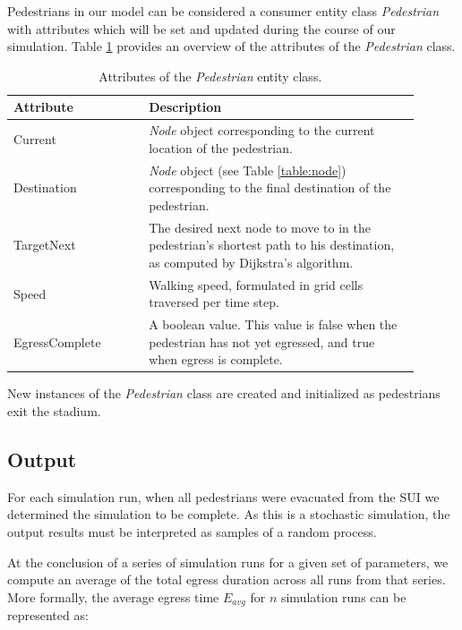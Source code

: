 \documentclass[12pt]{article}
\begin{document}
Pedestrians in our model can be considered a consumer entity class
\textit{Pedestrian} with attributes which will be set and updated during the
course of our simulation. Table \ref{table:ped} provides an overview of the
attributes of the \textit{Pedestrian} class.

\def\arraystretch{1.5}
\begin{table}[hb!]
  \centering
    \begin{tabular}{p{0.3\linewidth}p{0.6\linewidth}}
     \hline
     Attribute & Description \\
     \hline
     Current        & \textit{Node} object corresponding to the current
                      location of the pedestrian. \\
     Destination    & \textit{Node} object (see Table \ref{table:node})
                      corresponding to the final destination of the
                      pedestrian. \\
     TargetNext     & The desired next node to move to in the pedestrian's
                      shortest path to his destination, as computed by
                      Dijkstra's algorithm. \\
     Speed          & Walking speed, formulated in grid cells traversed per
                      time step. \\
     EgressComplete & A boolean value. This value is false when the pedestrian
                      has not yet egressed, and true when egress is complete. \\
     \hline
    \end{tabular}
    \caption{Attributes of the \textit{Pedestrian} entity class.}
  \label{table:ped}
\end{table}

New instances of the \textit{Pedestrian} class are created and initialized
as pedestrians exit the stadium.

\subsection{Output}
For each simulation run, when all pedestrians were evacuated from the SUI we
determined the simulation to be complete. As this is a stochastic simulation,
the output results must be interpreted as samples of a random process.

At the conclusion of a series of simulation runs for a given set of parameters,
we compute an average of the total egress duration across all runs from that
series. More formally, the average egress time $E_{avg}$ for $n$ simulation runs
can be represented as:
\end{document}
